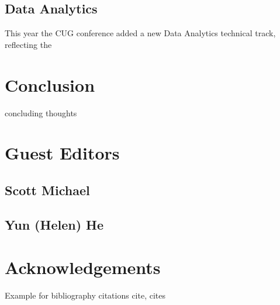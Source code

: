 \documentclass[AMA,LATO1COL,demo]{WileyNJD-v2}
\begin{document}
\subsection{Data Analytics}\label{sec:data}

This year the CUG conference added a new Data Analytics technical track, reflecting the 

\section{Conclusion}\label{sec:conclusion}

concluding thoughts

\section{Guest Editors}\label{sec:editors}
\subsection{Scott Michael}\label{sec:scott}
\subsection{Yun (Helen) He}\label{sec:helen}

\section{Acknowledgements}\label{sec:acknowledge}




Example for bibliography citations cite\cite{Taylor1937}, cites\cite{Knupp1999,Kamm2000}



%

\clearpage
\end{document}
